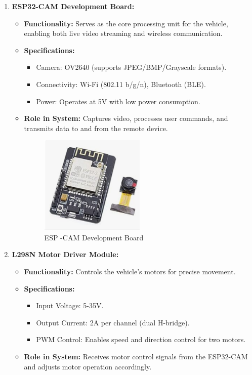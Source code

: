 \documentclass[12pt,a4paper]{report}
\begin{document}
\begin{enumerate}
    \item \textbf{ESP32-CAM Development Board:}
    \begin{itemize}
        \item \textbf{Functionality:} Serves as the core processing unit for the vehicle, enabling both live video streaming and wireless communication.
        \item \textbf{Specifications:}
        \begin{itemize}
            \item Camera: OV2640 (supports JPEG/BMP/Grayscale formats).
            \item Connectivity: Wi-Fi (802.11 b/g/n), Bluetooth (BLE).
            \item Power: Operates at 5V with low power consumption.
        \end{itemize}
        \item \textbf{Role in System:} Captures video, processes user commands, and transmits data to and from the remote device. \\ 
\begin{figure}[H]
    \centering
    \includegraphics[width=0.5\textwidth]{espCam}
    \caption{ESP -CAM Development Board}
    \label{fig:espCam}
\end{figure}
 
    \end{itemize}



    \item \textbf{L298N Motor Driver Module:}

    \begin{itemize}
        \item \textbf{Functionality:} Controls the vehicle's motors for precise movement.
        \item \textbf{Specifications:}
        \begin{itemize}
            \item Input Voltage: 5-35V.
            \item Output Current: 2A per channel (dual H-bridge).
            \item PWM Control: Enables speed and direction control for two motors.
        \end{itemize}
        \item \textbf{Role in System:} Receives motor control signals from the ESP32-CAM and adjusts motor operation accordingly.\\



\end{itemize}
\end{enumerate}
\end{document}
